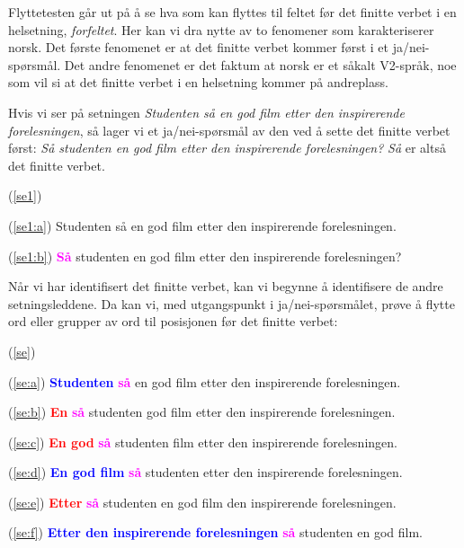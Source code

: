 \documentclass{article}
\begin{document}
Flyttetesten g{\aa}r ut p{\aa} {\aa} se hva som kan flyttes til feltet f{\o}r det finitte verbet i en helsetning, {\it forfeltet}. Her kan vi dra nytte av to fenomener som karakteriserer norsk. Det f{\o}rste fenomenet er at det finitte verbet kommer f{\o}rst i et ja/nei-sp{\o}rsm{\aa}l. Det andre fenomenet er det faktum at norsk er et s{\aa}kalt V2-spr{\aa}k, noe som vil si at det finitte verbet i en helsetning kommer p{\aa} andreplass.

Hvis vi ser p{\aa} setningen {\it Studenten s{\aa} en god film etter den inspirerende forelesningen}, s{\aa} lager vi et ja/nei-sp{\o}rsm{\aa}l av den ved {\aa} sette det finitte verbet f{\o}rst: {\it S{\aa} studenten en god film etter den inspirerende forelesningen?} {\it S{\aa}} er alts{\aa} det finitte verbet.

\begin{exe}
  \ex\label{se1} (\ref{se1})
  \begin{xlist}
    \ex\label{se1:a} (\ref{se1:a}) 
    Studenten s{\aa} en god film etter den inspirerende forelesningen.

    \ex\label{se1:b} (\ref{se1:b}) 
    \textcolor{magenta}{\bf S{\aa}} studenten en god film etter den inspirerende forelesningen?  \end{xlist}
\end{exe}

N{\aa}r vi har identifisert det finitte verbet, kan vi begynne {\aa} identifisere de andre setningsleddene. Da kan vi, med utgangspunkt i ja/nei-sp{\o}rsm{\aa}let, pr{\o}ve {\aa} flytte ord eller grupper av ord til posisjonen f{\o}r det finitte verbet:

\begin{exe}
\ex\label{se} (\ref{se})
\begin{xlist}
\ex\label{se:a} (\ref{se:a}) \textcolor{blue}{\bf Studenten} \textcolor{magenta}{\bf s{\aa}} en god film etter den inspirerende forelesningen.

\ex\label{se:b} (\ref{se:b}) \textcolor{red}{\bf En} \textcolor{magenta}{\bf s{\aa}} studenten god film etter den inspirerende forelesningen.

\ex\label{se:c} (\ref{se:c}) \textcolor{red}{\bf En god} \textcolor{magenta}{\bf s{\aa}} studenten film etter den inspirerende forelesningen.

\ex\label{se:d} (\ref{se:d}) \textcolor{blue}{\bf En god film} \textcolor{magenta}{\bf s{\aa}} studenten etter den inspirerende forelesningen.

\ex\label{se:e} (\ref{se:e}) \textcolor{red}{\bf Etter} \textcolor{magenta}{\bf s{\aa}} studenten en god film den inspirerende forelesningen.

\ex\label{se:f} (\ref{se:f}) \textcolor{blue}{\bf Etter den inspirerende forelesningen} \textcolor{magenta}{\bf s{\aa}} studenten en god film.
\end{xlist}
\end{exe}
\end{document}
